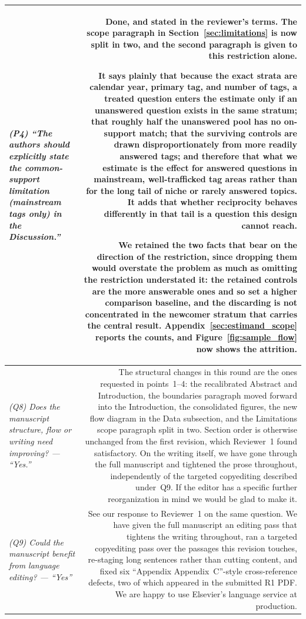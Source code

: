 \documentclass[11pt]{article}
\begin{document}
\begin{longtable}{@{}L R@{}}
\textit{(P4) ``The authors should explicitly state the common-support limitation (mainstream tags only) in the Discussion.''} &
Done, and stated in the reviewer's terms. The scope paragraph in Section~\ref{sec:limitations} is now split in two, and the second paragraph is given to this restriction alone.

It says plainly that because the exact strata are calendar year, primary tag, and number of tags, a treated question enters the estimate only if an unanswered question exists in the same stratum; that roughly half the unanswered pool has no on-support match; that the surviving controls are drawn disproportionately from more readily answered tags; and therefore that what we estimate is the effect for answered questions in mainstream, well-trafficked tag areas rather than for the long tail of niche or rarely answered topics. It adds that whether reciprocity behaves differently in that tail is a question this design cannot reach.

We retained the two facts that bear on the direction of the restriction, since dropping them would overstate the problem as much as omitting the restriction understated it: the retained controls are the more answerable ones and so set a higher comparison baseline, and the discarding is not concentrated in the newcomer stratum that carries the central result. Appendix~\ref{sec:estimand_scope} reports the counts, and Figure~\ref{fig:sample_flow} now shows the attrition.\\
\midrule

\textit{(Q8) Does the manuscript structure, flow or writing need improving? --- ``Yes.''} &
The structural changes in this round are the ones requested in points~1--4: the recalibrated Abstract and Introduction, the boundaries paragraph moved forward into the Introduction, the consolidated figures, the new flow diagram in the Data subsection, and the Limitations scope paragraph split in two. Section order is otherwise unchanged from the first revision, which Reviewer~1 found satisfactory. On the writing itself, we have gone through the full manuscript and tightened the prose throughout, independently of the targeted copyediting described under~Q9. If the editor has a specific further reorganization in mind we would be glad to make it.\\
\midrule

\textit{(Q9) Could the manuscript benefit from language editing? --- ``Yes''} &
See our response to Reviewer~1 on the same question. We have given the full manuscript an editing pass that tightens the writing throughout, ran a targeted copyediting pass over the passages this revision touches, re-staging long sentences rather than cutting content, and fixed six ``Appendix Appendix~C''-style cross-reference defects, two of which appeared in the submitted R1 PDF. We are happy to use Elsevier's language service at production.\\
\midrule


\end{longtable}
\end{document}

